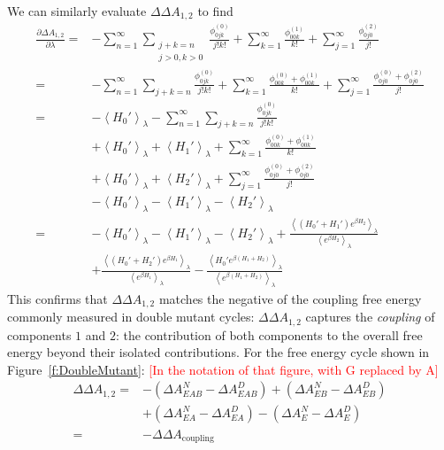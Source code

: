 \documentclass{article}
\newcommand{\warning}[1]{{\textsf{{\textcolor{red}{{[#1]}{}}}}}}
\begin{document}
\begin{appendices}
We can similarly evaluate $\Delta \Delta A_{1,2}$ to find
\begin{align}
\frac{\partial \Delta A_{1,2}}{\partial\lambda} =& 
	- \sum_{n=1}^{\infty}
	\sum_{\substack{j+k=n \\ j>0,k>0}}
	  \frac{\phi_{0jk}^{(0)}}{j!k!}
	+  \sum_{k=1}^{\infty}  \frac{\phi_{00k}^{(1)}}{k!}
	+  \sum_{j=1}^{\infty}  \frac{\phi_{0j0}^{(2)}}{j!}
\nonumber \\ =& 
	- \sum_{n=1}^{\infty}
	\sum_{j+k=n}
	  \frac{\phi_{0jk}^{(0)}}{j!k!}
	+  \sum_{k=1}^{\infty}  \frac{\phi_{00k}^{(0)}+\phi_{00k}^{(1)}}{k!}
	+  \sum_{j=1}^{\infty}  \frac{\phi_{0j0}^{(0)}+\phi_{0j0}^{(2)}}{j!}
\nonumber \\ =& 
	-\left \langle H_0'\right \rangle_{\lambda} - \sum_{n=1}^{\infty} \sum_{j+k=n} \frac{\phi_{0jk}^{(0)}}{j!k!}
\nonumber \\ & 
	+  \left \langle H_0'\right \rangle_{\lambda}+\left \langle H_1'\right \rangle_{\lambda}+\sum_{k=1}^{\infty}  \frac{\phi_{00k}^{(0)}+\phi_{00k}^{(1)}}{k!}
\nonumber \\ & 
	+ \left \langle H_0'\right \rangle_{\lambda}+\left \langle H_2'\right \rangle_{\lambda}+  \sum_{j=1}^{\infty}  \frac{\phi_{0j0}^{(0)}+\phi_{0j0}^{(2)}}{j!}
\nonumber \\ &
	-\left \langle H_0'\right \rangle_{\lambda}-\left \langle H_1'\right \rangle_{\lambda}-\left \langle H_2'\right \rangle_{\lambda}
\nonumber \\ =& 
	-\left \langle H_0'\right \rangle_{\lambda}-\left \langle H_1'\right \rangle_{\lambda}-\left \langle H_2'\right \rangle_{\lambda}
	+\frac
		{\left\langle (H_0' + H_1' )e^{\beta H_2} \right\rangle_\lambda}
		{\left\langle e^{\beta H_2} \right\rangle_\lambda}
\nonumber \\ &
	+\frac
		{\left\langle (H_0' + H_2' )e^{\beta H_1} \right\rangle_\lambda}
		{\left\langle e^{\beta H_1} \right\rangle_\lambda}
	-\frac
		{\left\langle H_0' e^{\beta (H_1+H_2)} \right\rangle_\lambda}
		{\left\langle e^{\beta (H_1+H_2)} \right\rangle_\lambda}		
\label{eq3:almost_taylor12}
\end{align}
This confirms that $\Delta \Delta A_{1,2}$ matches the negative of the coupling free energy commonly measured in double mutant cycles: $\Delta \Delta A_{1,2}$ captures the \textit{coupling} of components $1$ and $2$: the contribution of both components to the overall free energy beyond their isolated contributions. For the free energy cycle shown in Figure~\ref{f:DoubleMutant}: \warning{In the notation of that figure, with G replaced by A}
\begin{align}
\Delta \Delta A_{1,2} =& 
	-\left(\Delta A_{EAB}^N- \Delta A_{EAB}^D \right) + \left(\Delta A_{EB}^N- \Delta A_{EB}^D \right)
\nonumber \\ & 
	+ \left(\Delta A_{EA}^N- \Delta A_{EA}^D \right) - \left(\Delta A_{E}^N- \Delta A_{E}^D \right)
\nonumber \\  = &
	-\Delta \Delta A_{\text{coupling}}
\end{align}



\end{appendices}
\end{document}
